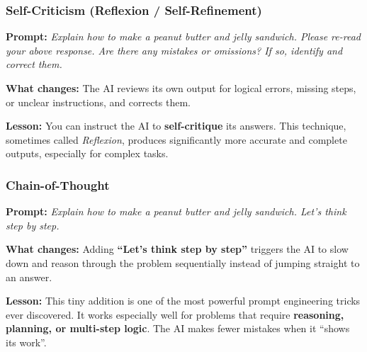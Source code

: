 \begin{frame}[fragile]\frametitle{Self-Criticism (Reflexion / Self-Refinement)}

\textbf{Prompt:} \emph{Explain how to make a peanut butter and jelly sandwich. Please re-read your above response. Are there any mistakes or omissions? If so, identify and correct them.}

\medskip
\textbf{What changes:} The AI reviews its own output for logical errors, missing steps, or unclear instructions, and corrects them.

\medskip
\textbf{Lesson:} You can instruct the AI to \textbf{self-critique} its answers. This technique, sometimes called \emph{Reflexion}, produces significantly more accurate and complete outputs, especially for complex tasks.


\end{frame}

\begin{frame}[fragile]\frametitle{Chain-of-Thought}

\textbf{Prompt:} \emph{Explain how to make a peanut butter and jelly sandwich. Let's think step by step.}

\medskip
\textbf{What changes:} Adding \textbf{``Let's think step by step''} triggers the AI to slow down and reason through the problem sequentially instead of jumping straight to an answer.

\medskip
\textbf{Lesson:} This tiny addition is one of the most powerful prompt engineering tricks ever discovered. It works especially well for problems that require \textbf{reasoning, planning, or multi-step logic}. The AI makes fewer mistakes when it ``shows its work''.


\end{frame}

